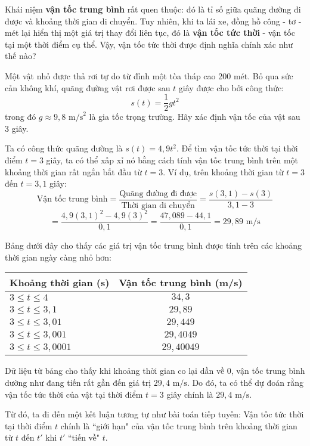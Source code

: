 Khái niệm \textbf{vận tốc trung bình} rất quen thuộc: đó là tỉ số giữa quãng đường đi được và khoảng thời gian di chuyển. Tuy nhiên, khi ta lái xe, đồng hồ công - tơ - mét lại hiển thị một giá trị thay đổi liên tục, đó là \textbf{vận tốc tức thời} - vận tốc tại một thời điểm cụ thể. Vậy, vận tốc tức thời được định nghĩa chính xác như thế nào?

\begin{example}
    Một vật nhỏ được thả rơi tự do từ đỉnh một tòa tháp cao 200 mét. Bỏ qua sức cản không khí, quãng đường vật rơi được sau $t$ giây được cho bởi công thức:
    \[s(t) = \dfrac{1}{2}gt^2\]
    trong đó $g \approx 9,8 \text{ m/s}^2$ là gia tốc trọng trường. Hãy xác định vận tốc của vật sau 3 giây.
\end{example}

\begin{solution}
    Ta có công thức quãng đường là $s(t) = 4,9t^2$. Để tìm vận tốc tức thời tại thời điểm $t=3$ giây, ta có thể xấp xỉ nó bằng cách tính vận tốc trung bình trên một khoảng thời gian rất ngắn bắt đầu từ $t=3$. Ví dụ, trên khoảng thời gian từ $t=3$ đến $t=3,1$ giây:
    \begin{equation*}
        \text{Vận tốc trung bình} = \dfrac{\text{Quãng đường đi được}}{\text{Thời gian di chuyển}} = \dfrac{s(3,1) - s(3)}{3,1 - 3}
    \end{equation*}
    \begin{equation*}
        = \dfrac{4,9(3,1)^2 - 4,9(3)^2}{0,1} = \dfrac{47,089 - 44,1}{0,1} = 29,89 \text{ m/s}
    \end{equation*}
    
    Bảng dưới đây cho thấy các giá trị vận tốc trung bình được tính trên các khoảng thời gian ngày càng nhỏ hơn:
    
    \begin{center}
        \begin{tabular}{|l|c|}
            \hline
            \textbf{Khoảng thời gian (s)} & \textbf{Vận tốc trung bình (m/s)} \\
            \hline
            $3 \le t \le 4$ & $34,3$ \\
            $3 \le t \le 3,1$ & $29,89$ \\
            $3 \le t \le 3,01$ & $29,449$ \\
            $3 \le t \le 3,001$ & $29,4049$ \\
            $3 \le t \le 3,0001$ & $29,40049$ \\
            \hline
        \end{tabular}
    \end{center}
    
    Dữ liệu từ bảng cho thấy khi khoảng thời gian co lại dần về 0, vận tốc trung bình dường như đang tiến rất gần đến giá trị $29,4 \text{ m/s}$. Do đó, ta có thể dự đoán rằng vận tốc tức thời của vật tại thời điểm $t=3$ giây chính là $29,4 \text{ m/s}$.
    
    Từ đó, ta đi đến một kết luận tương tự như bài toán tiếp tuyến: Vận tốc tức thời tại thời điểm $t$ chính là ``giới hạn" của vận tốc trung bình trên khoảng thời gian từ $t$ đến $t'$ khi $t'$ ``tiến về" $t$.
\end{solution}

